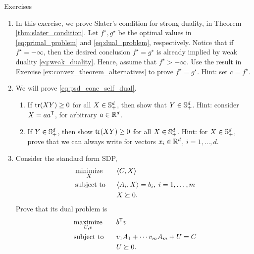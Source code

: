 \begin{xcb}{Exercises}
\begin{enumerate}[label=\thechapter.\arabic*]
\item \label{ex:slater_condition}
  In this exercise, we prove Slater's condition for strong duality, in Theorem 
  \ref{thm:slater_condition}. Let $f^\star, g^\star$ be the optimal values in 
  \eqref{eq:primal_problem} and \eqref{eq:dual_problem}, respectively. Notice
  that if $f^\star = -\infty$, then the desired conclusion $f^\star = g^\star$
  is already implied by weak duality \eqref{eq:weak_duality}. Hence, assume that 
  $f^\star > -\infty$. Use the result in Exercise
  \ref{ex:convex_theorem_alternatives} to prove $f^\star = g^\star$. Hint: set
  $c = f^\star$.  

\item \label{ex:psd_cone_self_dual}
  We will prove \eqref{eq:psd_cone_self_dual}. 

\begin{enumerate}[label=\alph*.]
\item If $\operatorname{tr}(XY) \geq 0$ for all $X \in \mathbb{S}_+^d$, then show that $Y \in
  \mathbb{S}_+^d$. Hint: consider $X = a a^{\mathsf{T}}$, for arbitrary $a \in \mathbb{R}^d$.

\item If $Y \in \mathbb{S}_+^d$, then show $\operatorname{tr}(XY) \geq 0$ for all $X \in
  \mathbb{S}_+^d$. Hint: for $X \in \mathbb{S}_+^d$, prove that we can always write  for vectors $x_i \in \mathbb{R}^d$, $i = 1,\dots,d$. 
\end{enumerate}

\item \label{ex:sdp_std_dual} 
  Consider the standard form SDP,
  \begin{alignat*}{2}
  &\operatorname*{minimize}_X \quad && \langle C, X \rangle \\
  &\operatorname{subject\,\,to} && \langle A_i, X \rangle = b_i, \; i=1,\dots,m \\
  & && X \succeq 0.
  \end{alignat*}
  Prove that its dual problem is 
  \begin{alignat*}{2}
  &\operatorname*{maximize}_{U,v} \quad && b^{\mathsf{T}} v \\
  &\operatorname{subject\,\,to} && v_1 A_1 + \cdots v_m A_m + U = C \\
  & && U \succeq 0.
  \end{alignat*}


\end{enumerate}
\end{xcb}
